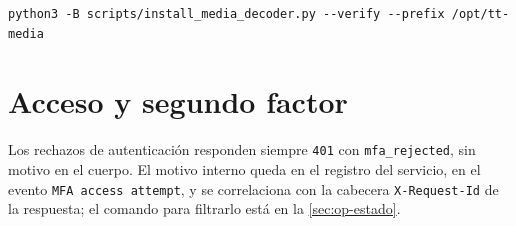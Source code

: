 \begin{verbatim}
python3 -B scripts/install_media_decoder.py --verify --prefix /opt/tt-media
\end{verbatim}

\section{Acceso y segundo factor}\label{sec:prob-acceso}

Los rechazos de autenticación responden siempre \texttt{401} con
\texttt{mfa\_rejected}, sin motivo en el cuerpo. El motivo interno queda en el
registro del servicio, en el evento \texttt{MFA access attempt}, y se
correlaciona con la cabecera \texttt{X-Request-Id} de la respuesta; el
comando para filtrarlo está en la \cref{sec:op-estado}.

